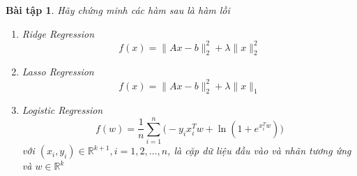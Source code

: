 \documentclass[14pt, a4paper]{article}
\theoremstyle{sltheorem}
\newtheorem{baitap}{Bài tập}
\theoremstyle{soltheorem}
\begin{document}
\begin{titlepage}





        \vfill %

    \end{titlepage}

    \nocite{*}

    \newpage

    \begin{baitap}
        Hãy chứng minh các hàm sau là hàm lồi

        \begin{enumerate}[wide, labelwidth=!, labelindent=0pt,label=\textbf{\arabic*}.]
            \item Ridge Regression
            \begin{equation*}
                f(x)=\lVert Ax - b \rVert_2^2 + \lambda \lVert x \rVert_2^2
            \end{equation*}
            \item Lasso Regression
            \begin{equation*}
                f(x)=\lVert Ax - b \rVert_2^2 + \lambda \lVert x \rVert_1
            \end{equation*}
            \item Logistic Regression
            \begin{equation*}
                f(w)=\dfrac{1}{n}\sum_{i=1}^n \Big( -y_i x_i^T w + \ln(1 + e^{x_i^T w}) \Big)
            \end{equation*}
            với $(x_i, y_i) \in \mathbb{R}^{k+1},i=1,2,\dots,n$, là cặp dữ liệu đầu vào và nhãn tương ứng và $w \in \mathbb{R}^k$
        \end{enumerate}
    \end{baitap}
\end{document}
